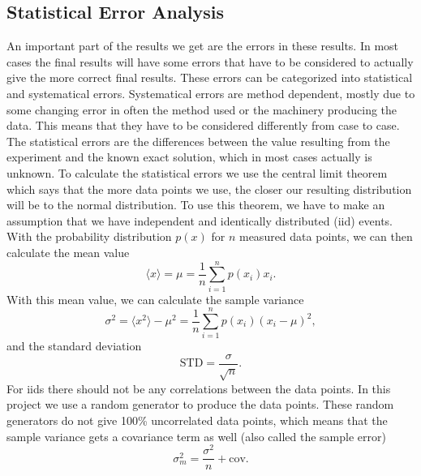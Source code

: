 \documentclass[12pt,a4paper,english]{article}
\begin{document}
\subsection{Statistical Error Analysis}
\label{subsect:Error_analysis}
An important part of the results we get are the errors in these results. In most cases the final results will have some errors that have to be considered to actually give the more correct final results. These errors can be categorized into statistical and systematical errors. Systematical errors are method dependent, mostly due to some changing error in often the method used or the machinery producing the data. This means that they have to be considered differently from case to case. The statistical errors are the differences between the value resulting from the experiment and the known exact solution, which in most cases actually is unknown. To calculate the statistical errors we use the central limit theorem which says that the more data points we use, the closer our resulting distribution will be to the normal distribution. To use this theorem, we have to make an assumption that we have independent and identically distributed (iid) events. With the probability distribution $p(x)$ for $n$ measured data points, we can then calculate the mean value
\begin{equation}
\label{eq:stat_mean}
\langle x \rangle =\mu=\frac{1}{n}\sum_{i=1}^{n}p(x_i)x_i.
\end{equation}
With this mean value, we can calculate the sample variance 
\begin{equation}
\label{eq:stat_ar}
\sigma^2=\langle x^2 \rangle-\mu^2=\frac{1}{n}\sum_{i=1}^{n}p(x_i)(x_i-\mu)^2,
\end{equation}
and the standard deviation
\begin{equation}
\label{eq:stat_STD}
\text{STD}=\frac{\sigma}{\sqrt{n}}.
\end{equation}
For iids there should not be any correlations between the data points. In this project we use a random generator to produce the data points. These random generators do not give 100\% uncorrelated data points, which means that the sample variance gets a covariance term as well (also called the sample error)
\begin{equation}
\label{eq:stat_var_cov}
\sigma_m^2=\frac{\sigma^2}{n}+\text{cov}.
\end{equation}
\end{document}
